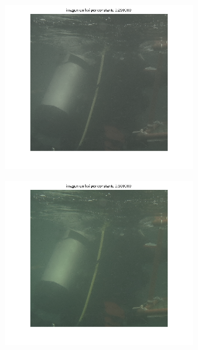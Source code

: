 \documentclass{article}
\begin{document}
\begin{figure}[H]
	\begin{subfigure}{0.5\textwidth}
	\centering
        \includegraphics[width=0.9\textwidth]{1908xx-sat-por-025.png}
    \end{subfigure}\hfill
	\begin{subfigure}{0.5\textwidth}
	\centering
        \includegraphics[width=0.9\textwidth]{1908xx-sat-por-050.png}
    \end{subfigure}\hfill
	\begin{subfigure}{0.5\textwidth}
	\centering

\end{subfigure}
\end{figure}
\end{document}
